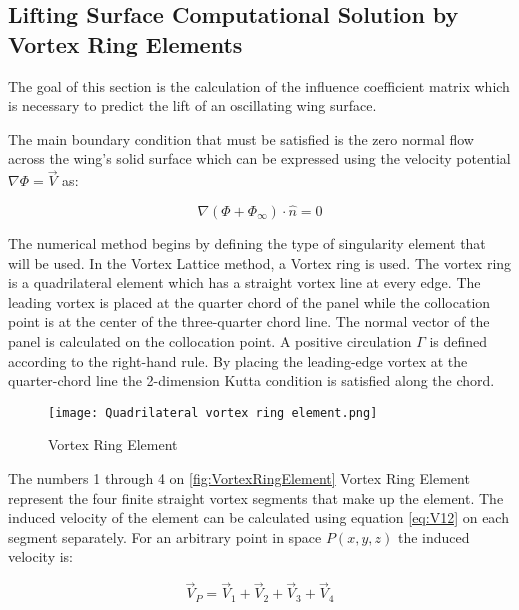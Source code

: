 \subsection{Lifting Surface Computational Solution by Vortex Ring
Elements}\label{lifting-surface-computational-solution-by-vortex-ring-elements}

The goal of this section is the calculation of the influence coefficient
matrix which is necessary to predict the lift of an oscillating wing
surface.

The main boundary condition that must be satisfied is the zero normal
flow across the wing's solid surface which can be expressed using the
velocity potential $\nabla\Phi = \vec{V}$ as:

\begin{equation}
\nabla\left( \Phi + \Phi_{\infty} \right) \cdot \hat{n} = 0
\end{equation}

The numerical method begins by defining the type of singularity element
that will be used. In the Vortex Lattice method, a Vortex ring is used.
The vortex ring is a quadrilateral element which has a straight vortex
line at every edge. The leading vortex is placed at the quarter chord of
the panel while the collocation point is at the center of the
three-quarter chord line. The normal vector of the panel is calculated
on the collocation point. A positive circulation $\Gamma$ is defined
according to the right-hand rule. By placing the leading-edge vortex at
the quarter-chord line the 2-dimension Kutta condition is satisfied
along the chord.

\begin{figure}[H]
  \centering
  \texttt{[image: Quadrilateral vortex ring element.png]}
  \caption{Vortex Ring Element}
  \label{fig:VortexRingElement}
\end{figure}



The numbers 1 through 4 on \autoref{fig:VortexRingElement} Vortex Ring Element represent the
four finite straight vortex segments that make up the element. The
induced velocity of the element can be calculated using equation
\eqref{eq:V12} on each segment separately. For an arbitrary point in space
$P(x,y,z)$ the induced velocity is:

\begin{equation}
{\vec{V}}_{P} = {\vec{V}}_{1} + {\vec{V}}_{2} + {\vec{V}}_{3} + {\vec{V}}_{4}
\end{equation}

